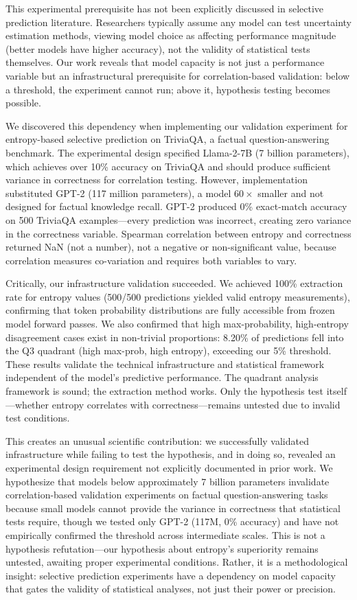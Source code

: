 This experimental prerequisite has not been explicitly discussed in selective prediction literature. Researchers typically assume any model can test uncertainty estimation methods, viewing model choice as affecting performance magnitude (better models have higher accuracy), not the validity of statistical tests themselves. Our work reveals that model capacity is not just a performance variable but an infrastructural prerequisite for correlation-based validation: below a threshold, the experiment cannot run; above it, hypothesis testing becomes possible.

We discovered this dependency when implementing our validation experiment for entropy-based selective prediction on TriviaQA, a factual question-answering benchmark. The experimental design specified Llama-2-7B (7 billion parameters), which achieves over 10\% accuracy on TriviaQA and should produce sufficient variance in correctness for correlation testing. However, implementation substituted GPT-2 (117 million parameters), a model $60\times$ smaller and not designed for factual knowledge recall. GPT-2 produced 0\% exact-match accuracy on 500 TriviaQA examples---every prediction was incorrect, creating zero variance in the correctness variable. Spearman correlation between entropy and correctness returned NaN (not a number), not a negative or non-significant value, because correlation measures co-variation and requires both variables to vary.

Critically, our infrastructure validation succeeded. We achieved 100\% extraction rate for entropy values (500/500 predictions yielded valid entropy measurements), confirming that token probability distributions are fully accessible from frozen model forward passes. We also confirmed that high max-probability, high-entropy disagreement cases exist in non-trivial proportions: 8.20\% of predictions fell into the Q3 quadrant (high max-prob, high entropy), exceeding our 5\% threshold. These results validate the technical infrastructure and statistical framework independent of the model's predictive performance. The quadrant analysis framework is sound; the extraction method works. Only the hypothesis test itself---whether entropy correlates with correctness---remains untested due to invalid test conditions.

This creates an unusual scientific contribution: we successfully validated infrastructure while failing to test the hypothesis, and in doing so, revealed an experimental design requirement not explicitly documented in prior work. We hypothesize that models below approximately 7 billion parameters invalidate correlation-based validation experiments on factual question-answering tasks because small models cannot provide the variance in correctness that statistical tests require, though we tested only GPT-2 (117M, 0\% accuracy) and have not empirically confirmed the threshold across intermediate scales. This is not a hypothesis refutation---our hypothesis about entropy's superiority remains untested, awaiting proper experimental conditions. Rather, it is a methodological insight: selective prediction experiments have a dependency on model capacity that gates the validity of statistical analyses, not just their power or precision.

